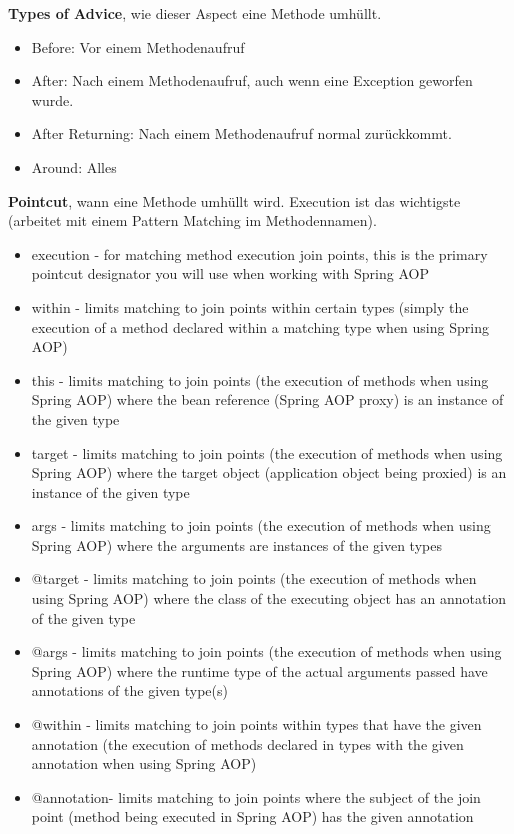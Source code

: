 \documentclass[10pt]{scrartcl}
\newcommand{\Bold}[1]{\textbf{#1}} %
\begin{document}
\Bold{Types of Advice}, wie dieser Aspect eine Methode umhüllt.
\begin{itemize}
	\item Before: Vor einem Methodenaufruf
	\item After: Nach einem Methodenaufruf, auch wenn eine Exception geworfen wurde.
	\item After Returning: Nach einem Methodenaufruf normal zurückkommt.
	\item Around: Alles
\end{itemize}

\Bold{Pointcut}, wann eine Methode umhüllt wird. Execution ist das wichtigste (arbeitet mit einem Pattern Matching im Methodennamen).
\begin{itemize}
	\item execution - for matching method execution join points, this is the primary pointcut designator you will use when working with Spring AOP
	\item within - limits matching to join points within certain types (simply the execution of a method declared within a matching type when using Spring AOP)
	\item this - limits matching to join points (the execution of methods when using Spring AOP) where the bean reference (Spring AOP proxy) is an instance of the given type
	\item target - limits matching to join points (the execution of methods when using Spring AOP) where the target object (application object being proxied) is an instance of the given type
	\item args - limits matching to join points (the execution of methods when using Spring AOP) where the arguments are instances of the given types
	\item @target - limits matching to join points (the execution of methods when using Spring AOP) where the class of the executing object has an annotation of the given type
	\item @args - limits matching to join points (the execution of methods when using Spring AOP) where the runtime type of the actual arguments passed have annotations of the given type(s)
	\item @within - limits matching to join points within types that have the given annotation (the execution of methods declared in types with the given annotation when using Spring AOP)
	\item @annotation- limits matching to join points where the subject of the join point (method being executed in Spring AOP) has the given annotation
\end{itemize}
\end{document}

